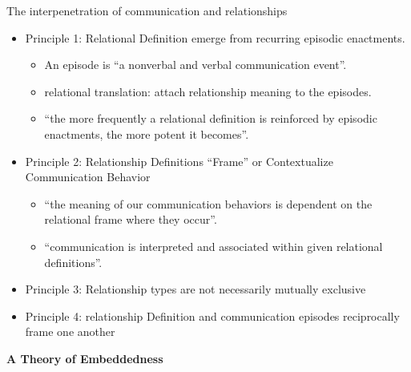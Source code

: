 \documentclass[
]{book}
\providecommand{\tightlist}{%
  \setlength{\itemsep}{0pt}\setlength{\parskip}{0pt}}
\begin{document}
The interpenetration of communication and relationships

\begin{itemize}
\item
  Principle 1: Relational Definition emerge from recurring episodic enactments.

  \begin{itemize}
  \tightlist
  \item
    An episode is ``a nonverbal and verbal communication event''.
  \item
    relational translation: attach relationship meaning to the episodes.
  \item
    ``the more frequently a relational definition is reinforced by episodic enactments, the more potent it becomes''.
  \end{itemize}
\item
  Principle 2: Relationship Definitions ``Frame'' or Contextualize Communication Behavior

  \begin{itemize}
  \tightlist
  \item
    ``the meaning of our communication behaviors is dependent on the relational frame where they occur''.\\
  \item
    ``communication is interpreted and associated within given relational definitions''.
  \end{itemize}
\item
  Principle 3: Relationship types are not necessarily mutually exclusive
\item
  Principle 4: relationship Definition and communication episodes reciprocally frame one another
\end{itemize}

\textbf{A Theory of Embeddedness}
\end{document}
